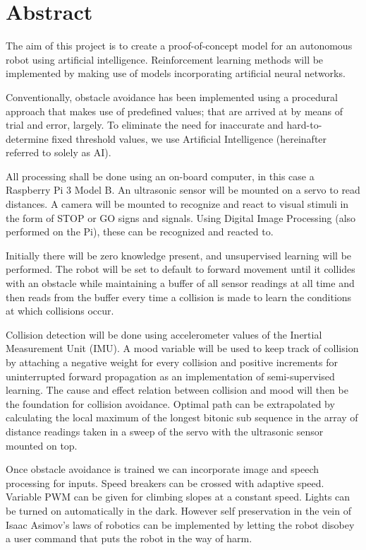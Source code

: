 \documentclass[12pt]{article}
\begin{document}
\section{Abstract} \label{sec:abstract}
The aim of this project is to create a proof-of-concept model for an autonomous robot using artificial intelligence. Reinforcement learning methods will be implemented by making use of models incorporating artificial neural networks.

Conventionally, obstacle avoidance has been implemented using a procedural approach that makes use of predefined values; that are arrived at by means of trial and error, largely. To eliminate the need for inaccurate and hard-to-determine fixed threshold values, we use Artificial Intelligence (hereinafter referred to solely as AI).

All processing shall be done using an on-board computer, in this case a Raspberry Pi 3 Model B. An ultrasonic sensor will be mounted on a servo to read distances. A camera will be mounted to recognize and react to visual stimuli in the form of STOP or GO signs and signals. Using Digital Image Processing (also performed on the Pi), these can be recognized and reacted to. 

Initially there will be zero knowledge present, and unsupervised learning will be performed. The robot will be set to default to forward movement until it collides with an obstacle while maintaining a buffer of all sensor readings at all time and then reads from the buffer every time a collision is made to learn the conditions at which collisions occur.

Collision detection will be done using accelerometer values of the Inertial Measurement Unit (IMU). A mood variable will be used to keep track of collision by attaching a negative weight for every collision and positive increments for uninterrupted forward propagation as an implementation of semi-supervised learning. The cause and effect relation between collision and mood will then be the foundation for collision avoidance. Optimal path can be extrapolated by calculating the local maximum of the longest bitonic sub sequence in the array of distance readings taken in a sweep of the servo with the ultrasonic sensor mounted on top.

Once obstacle avoidance is trained we can incorporate image and speech processing for inputs. Speed breakers can be crossed with adaptive speed. Variable PWM can be given for climbing slopes at a constant speed. Lights can be turned on automatically in the dark. 
However self preservation in the vein of Isaac Asimov's laws of robotics can be implemented by letting the robot disobey a user command that puts the robot in the way of harm. 
\end{document}
